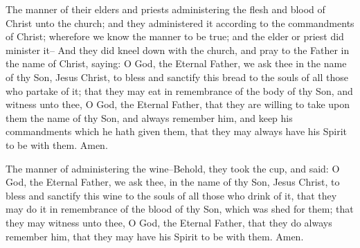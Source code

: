 \bchapter
\bverse \iffalse The manner of their elders and priests administering the flesh and blood of Christ unto the church; and they administered it according to the commandments of Christ; wherefore we know the manner to be true; and the elder or priest did minister it-- \fi
The manner of their elders and priests administering the flesh and blood of Christ unto the church; and they administered it according to the commandments of Christ; wherefore we know the manner to be true; and the elder or priest did minister it--
\bverse \iffalse And they did kneel down with the church, and pray to the Father in the name of Christ, saying: \fi
And they did kneel down with the church, and pray to the Father in the name of Christ, saying:
\bverse \iffalse O God, the Eternal Father, we ask thee in the name of thy Son, Jesus Christ, to bless and sanctify this bread to the souls of all those who partake of it; that they may eat in remembrance of the body of thy Son, and witness unto thee, O God, the Eternal Father, that they are willing to take upon them the name of thy Son, and always remember him, and keep his commandments which he hath given them, that they may always have his Spirit to be with them. Amen. \fi
O God, the Eternal Father, we ask thee in the name of thy Son, Jesus Christ, to bless and sanctify this bread to the souls of all those who partake of it; that they may eat in remembrance of the body of thy Son, and witness unto thee, O God, the Eternal Father, that they are willing to take upon them the name of thy Son, and always remember him, and keep his commandments which he hath given them, that they may always have his Spirit to be with them. Amen.

\bchapter
\bverse \iffalse The manner of administering the wine--Behold, they took the cup, and said: \fi
The manner of administering the wine--Behold, they took the cup, and said:
\bverse \iffalse O God, the Eternal Father, we ask thee, in the name of thy Son, Jesus Christ, to bless and sanctify this wine to the souls of all those who drink of it, that they may do it in remembrance of the blood of thy Son, which was shed for them; that they may witness unto thee, O God, the Eternal Father, that they do always remember him, that they may have his Spirit to be with them.  Amen. \fi
O God, the Eternal Father, we ask thee, in the name of thy Son, Jesus Christ, to bless and sanctify this wine to the souls of all those who drink of it, that they may do it in remembrance of the blood of thy Son, which was shed for them; that they may witness unto thee, O God, the Eternal Father, that they do always remember him, that they may have his Spirit to be with them.  Amen.

